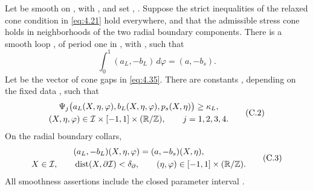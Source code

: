 \begin{lemma}\label{lem:C.1}
Let  be smooth on , with
, and set
, .
Suppose the strict inequalities of the relaxed cone condition in \eqref{eq:4.21} hold everywhere, and that the
admissible stress cone holds in neighborhoods of the two radial boundary components. There is a
smooth loop , of period one in , with
, such that
\begin{equation}
 \int_0^1 (a_L,-b_L)\,d\varphi=(a,-b_s).
\tag{C.1}\label{eq:C.1}
\end{equation}
Let  be the vector of cone gaps in \eqref{eq:4.35}. There are constants
, depending on the fixed data
, such that
\begin{equation}
\begin{gathered}
 \Psi_j\bigl(a_L(X,\eta,\varphi),b_L(X,\eta,\varphi),p_s(X,\eta)\bigr)\geq\kappa_L,\\
 (X,\eta,\varphi)\in\mathcal I\times[-1,1]\times(\mathbb{R}/\mathbb{Z}),
 \qquad j=1,2,3,4.
\end{gathered}
\tag{C.2}\label{eq:C.2}
\end{equation}
%
On the radial boundary collars,
\begin{equation}
\begin{gathered}
 (a_L,-b_L)(X,\eta,\varphi)=(a,-b_s)(X,\eta),\\
 X\in\mathcal I,\qquad \operatorname{dist}(X,\partial\mathcal I)<\delta_\partial,
 \qquad (\eta,\varphi)\in[-1,1]\times(\mathbb{R}/\mathbb{Z}).
\end{gathered}
\tag{C.3}\label{eq:C.3}
\end{equation}
All smoothness assertions include the closed parameter interval
.
\end{lemma}


